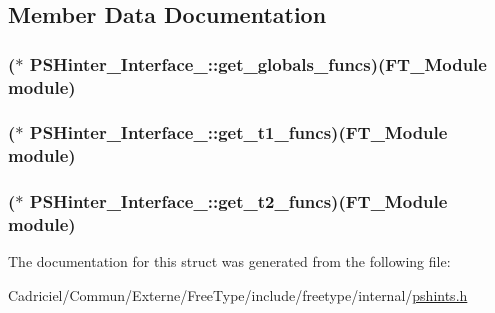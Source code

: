 \subsection{Member Data Documentation}
\hypertarget{struct_p_s_hinter___interface___a59c68da021c7c0fadcb8bcc8c9a5ba75}{
\subsubsection[{get\-\_\-globals\-\_\-funcs}]{($\ast$ P\-S\-Hinter\-\_\-\-Interface\-\_\-\-::get\-\_\-globals\-\_\-funcs)({\bf F\-T\-\_\-\-Module} module)}}\label{struct_p_s_hinter___interface___a59c68da021c7c0fadcb8bcc8c9a5ba75}
\hypertarget{struct_p_s_hinter___interface___a9b5405d780efc53df42c3a3e4f8e844b}{
\subsubsection[{get\-\_\-t1\-\_\-funcs}]{($\ast$ P\-S\-Hinter\-\_\-\-Interface\-\_\-\-::get\-\_\-t1\-\_\-funcs)({\bf F\-T\-\_\-\-Module} module)}}\label{struct_p_s_hinter___interface___a9b5405d780efc53df42c3a3e4f8e844b}
\hypertarget{struct_p_s_hinter___interface___a7ecbd2179450d996111ec51e8d50ecc3}{
\subsubsection[{get\-\_\-t2\-\_\-funcs}]{($\ast$ P\-S\-Hinter\-\_\-\-Interface\-\_\-\-::get\-\_\-t2\-\_\-funcs)({\bf F\-T\-\_\-\-Module} module)}}\label{struct_p_s_hinter___interface___a7ecbd2179450d996111ec51e8d50ecc3}


The documentation for this struct was generated from the following file\-:\begin{DoxyCompactItemize}
\item 
Cadriciel/\-Commun/\-Externe/\-Free\-Type/include/freetype/internal/\hyperlink{pshints_8h}{pshints.\-h}\end{DoxyCompactItemize}
